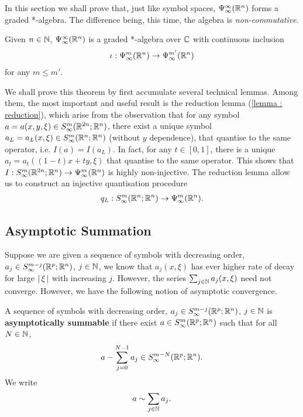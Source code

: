 \documentclass[12pt]{article}
\begin{document}
In this section we shall prove that, just like symbol spaces, $\Psi^\infty_\infty({\mathbb R}^n)$ forms a graded *-algebra. The difference being, this time, the algebra is \emph{non-commutative}. 

\begin{ftheorem}[Summary] \label{theorem : summary for pseudo}
    Given $n \in {\ensuremath {\mathbb N}}$, $\Psi^\infty_\infty({\mathbb R}^n)$ is a graded *-algebra over ${\mathbb C}$ with continuous inclusion 
    \begin{align*}
        \iota : \Psi^m_\infty({\mathbb R}^n) \to \Psi^{m'}_\infty({\mathbb R}^n)
    \end{align*}
    for any $m \leq m'$. 
\end{ftheorem}

We shall prove this theorem by first accumulate several technical lemmas. Among them, the most important and useful result is the reduction lemma (\ref{lemma : reduction}), which arise from the observation that for any symbol $a = a(x, y, \xi) \in S^{m}_\infty({\mathbb R}^{2n}; {\mathbb R}^n)$, there exist a unique symbol $a_L = a_L(x, \xi) \in S^{m}_\infty({\mathbb R}^{n}; {\mathbb R}^n)$ (without $y$ dependence), that quantise to the same operator, i.e.  $I(a) = I(a_L)$. In fact, for any $t \in [0, 1]$, there is a unique $a_t = a_t((1 - t)x + ty, \xi)$ that quantise to the same operator. This shows that  $I : S^{m}_\infty({\mathbb R}^{2n}; {\mathbb R}^n) \to \Psi^{m}_{\infty}({\mathbb R}^n)$ is highly non-injective. The reduction lemma allow us to construct an injective quantisation procedure
\begin{align*}
q_L : S^{m}_\infty({\mathbb R}^{n}; {\mathbb R}^n) \to \Psi^{m}_{\infty}({\mathbb R}^n). 
\end{align*}


\subsection{Asymptotic Summation}
Suppose we are given a sequence of symbols with decreasing order, $a_j \in S^{m-j}_\infty({\mathbb R}^{p}; {\mathbb R}^n)$, $j \in {\ensuremath {\mathbb N}}$, we know that  $a_j(x, \xi)$ has ever higher rate of decay for large $\left|\, \xi\,\right|$ with increasing $j$. However, the series $\sum_{j \in {\ensuremath {\mathbb N}}} a_j(x, \xi)$ need not converge. However, we have the following notion of asymptotic convergence. 
\begin{fdefinition} \label{def : asymptotic sumation}
    A sequence of symbols with decreasing order, $a_j \in S^{m-j}_\infty({\mathbb R}^{p}; {\mathbb R}^n)$, $j \in {\ensuremath {\mathbb N}}$ is \textbf{asymptotically summable} if there exist $a \in S^{m}_\infty({\mathbb R}^{p}; {\mathbb R}^n)$ such that for all $N \in {\ensuremath {\mathbb N}}$, 
    \begin{align*}
        a - \sum_{j = 0}^{N -1} a_j \in S^{m-N}_\infty({\mathbb R}^{p}; {\mathbb R}^n). 
    \end{align*}
    We write
    \begin{align*}
        a \sim \sum_{j \in {\ensuremath {\mathbb N}}} a_j. 
    \end{align*}
\end{fdefinition}
\end{document}
